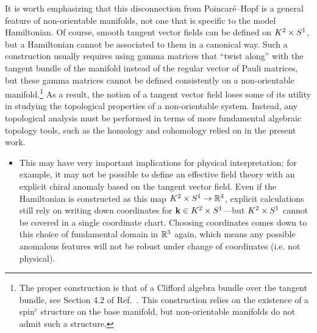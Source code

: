 It is worth emphasizing that this disconnection from Poincaré--Hopf is a general feature of non-orientable manifolds, not one that is specific to the model Hamiltonian. Of course, smooth tangent vector fields can be defined on $K^2\times S^1$, but a Hamiltonian cannot be associated to them in a canonical way. Such a construction usually requires using gamma matrices that ``twist along'' with the tangent bundle of the manifold instead of the regular vector of Pauli matrices, but these gamma matrices cannot be defined consistently on a non-orientable manifold.\footnote{
	The proper construction is that of a Clifford algebra bundle over the tangent bundle, see Section 4.2 of Ref.~\cite{Mathai_math-review}. This construction relies on the existence of a spin$^c$ structure on the base manifold, but non-orientable manifolds do not admit such a structure. } %
As a result, the notion of a tangent vector field loses some of its utility in studying the topological properties of a non-orientable system. Instead, any topological analysis must be performed in terms of more fundamental algebraic topology tools, such as the homology and cohomology relied on in the present work.

{\color{blue}
\begin{itemize} %
	\item This may have very important implications for physical interpretation; for example, it may not be possible to define an effective field theory with an explicit chiral anomaly based on the tangent vector field. Even if the Hamiltonian is constructed as this map $K^2\times S^1\to\mathbb{R}^3$, explicit calculations still rely on writing down coordinates for $\vb{k}\in K^2\times S^1$---but $K^2\times S^1$ cannot be covered in a single coordinate chart. Choosing coordinates comes down to this choice of fundamental domain in $\mathbb{R}^3$ again, which means any possible anomalous features will not be robust under change of coordinates (i.e. not physical).
\end{itemize}
}

